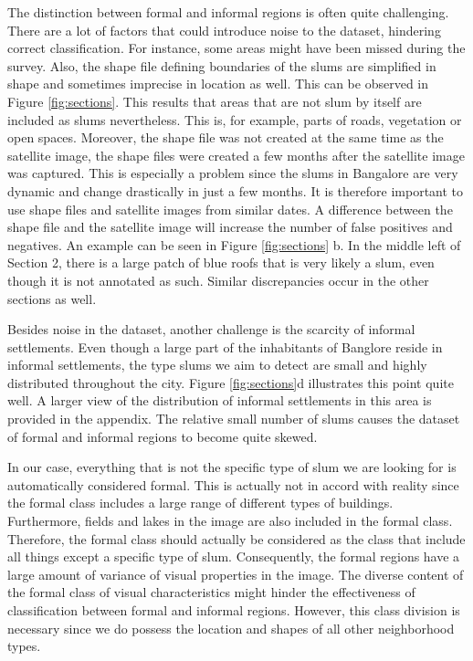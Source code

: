 The distinction between formal and informal regions is often quite challenging. There are a lot of factors that could introduce noise to the dataset, hindering correct classification. For instance, some areas might have been missed during the survey. Also, the shape file defining boundaries of the slums are simplified in shape and sometimes imprecise in location as well. This can be observed in Figure \ref{fig:sections}. This results that areas that are not slum by itself are included as slums nevertheless. This is, for example, parts of roads, vegetation or open spaces. Moreover, the shape file was not created at the same time as the satellite image, the shape files were created a few months after the satellite image was captured. This is especially a problem since the slums in Bangalore are very dynamic and change drastically in just a few months. It is therefore important to use shape files and satellite images from similar dates. A difference between the shape file and the satellite image will increase the number of false positives and negatives. An example can be seen in Figure \ref{fig:sections} b. In the middle left of Section 2, there is a large patch of blue roofs that is very likely a slum, even though it is not annotated as such. Similar discrepancies occur in the other sections as well. 

Besides noise in the dataset, another challenge is the scarcity of informal settlements.  Even though a large part of the inhabitants of Banglore reside in informal settlements, the type slums we aim to detect are small and highly distributed throughout the city. Figure \ref{fig:sections}d illustrates this point quite well. A larger view of the distribution of informal settlements in this area is provided in the appendix. The relative small number of slums causes the dataset of formal and informal regions to become quite skewed.

In our case, everything that is not the specific type of slum we are looking for is automatically considered formal. This is actually not in accord with reality since the formal class includes a large range of different types of buildings. Furthermore, fields and lakes in the image are also included in the formal class. Therefore, the formal class should actually be considered as the class that include all things except a specific type of slum. Consequently, the formal regions have a large amount of variance of visual properties in the image. The diverse content of the formal class of visual characteristics might hinder the effectiveness of classification between formal and informal regions. However, this class division is necessary since we do possess the location and shapes of all other neighborhood types.

